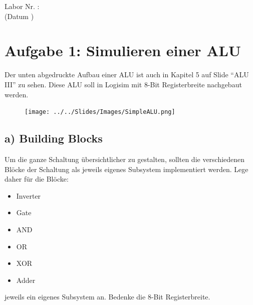 \documentclass[a4paper]{scrartcl}
\def\header#1#2{
  \begin{center}
    {\Large Labor #1: \TOPIC}\\
    {(Datum #2)}
  \end{center}
}
\begin{document}
\header{Nr. \NUMBER}{\DATE}



\section*{Aufgabe 1: Simulieren einer ALU}
Der unten abgedruckte Aufbau einer ALU ist auch in Kapitel 5 auf Slide ``ALU III'' zu sehen. Diese ALU soll in Logisim mit 8-Bit Registerbreite
nachgebaut werden. 
  
\begin{figure}[h]
  \centering
    \texttt{[image: ../../Slides/Images/SimpleALU.png]}
  \end{figure}

\subsection*{a) Building Blocks}
Um die ganze Schaltung übersichtlicher zu gestalten, sollten die verschiedenen Blöcke der Schaltung als jeweils eigenes 
Subsystem implementiert werden. Lege daher für die Blöcke:
\begin{itemize}
  \item Inverter
  \item Gate
  \item AND
  \item OR
  \item XOR
  \item Adder 
\end{itemize}

jeweils ein eigenes Subsystem an. Bedenke die 8-Bit Registerbreite.
\end{document}
